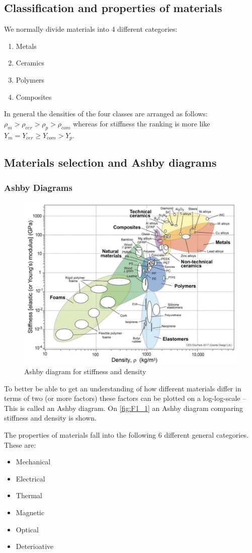 \subsection{Classification and properties of materials}
We normally divide materials into 4 different categories:
\begin{enumerate}
  \item Metals
  \item Ceramics
  \item Polymers
  \item Composites
\end{enumerate}

In general the densities of the four classes are arranged as follows: $\rho_m > \rho_{cer} > \rho_p > \rho_{com}$ whereas for stiffness the ranking is more like $Y_m = Y_{cer} \geq Y_{com} > Y_p$.

\subsection{Materials selection and Ashby diagrams}

\subsubsection{Ashby Diagrams}

\begin{figure} [ht]
  \centering
  \includegraphics[width=0.65\linewidth]{./figures/F1_1.png}
  \caption{Ashby diagram for stiffness and density}
  \label{fig:F1_1}
\end{figure}
To better be able to get an understanding of how different materials differ in terms of two (or more factors) these factors can be plotted on a log-log-scale -- This is called an Ashby diagram. On \autoref{fig:F1_1} an Ashby diagram comparing stiffness and density is shown.

The properties of materials fall into the following 6 different general categories. These are:
\begin{itemize}
  \item Mechanical
  \item Electrical
  \item Thermal
  \item Magnetic
  \item Optical
  \item Deterioative
\end{itemize}

